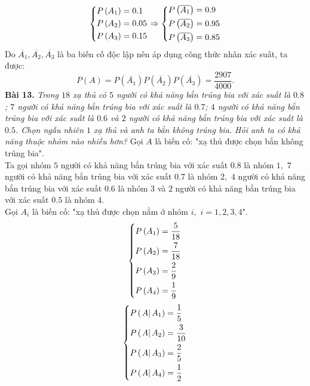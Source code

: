 \documentclass[12pt,a4paper]{article}
\begin{document}
$$\left\{ \begin{gathered}
  P\left( {{A_1}} \right) = 0.1 \hfill \\
  P\left( {{A_2}} \right) = 0.05 \hfill \\
  P\left( {{A_3}} \right) = 0.15 \hfill \\ 
\end{gathered}  \right. \Rightarrow \left\{ \begin{gathered}
  P\left( {\overline {{A_1}} } \right) = 0.9 \hfill \\
  P\left( {\overline {{A_2}} } \right) = 0.95 \hfill \\
  P\left( {\overline {{A_3}} } \right) = 0.85 \hfill \\ 
\end{gathered}  \right.$$
Do $\overline{A_1}, \overline{A_2},\overline{A_3}$ là ba biến cố độc lập nên áp dụng công thức nhân xác suất, ta được:
$$P\left( A \right) = P\left( {\overline {{A_1}} } \right)P\left( {\overline {{A_2}} } \right)P\left( {\overline {{A_3}} } \right) = \frac{{2907}}{{4000}}.$$
\textbf{Bài 13.} \textit{Trong $18$ xạ thủ có $5$ người có khả năng bắn trúng bia với xác suất là $0.8$; $7$ người có khả năng bắn trúng bia với xác suất là $0.7$; $4$ người có khả năng bắn trúng bia với xác suất là $0.6$ và $2$ người có khả năng bắn trúng bia với xác suất là $0.5$. Chọn  ngẫu  nhiên  $1$  xạ  thủ  và  anh  ta  bắn  không  trúng  bia.  Hỏi  anh  ta  có  khả  năng thuộc nhóm nào nhiều hơn?}
Gọi $A$ là biến cố: "xạ thủ được chọn bắn không trúng bia".\\
Ta gọi nhóm $5$ người có khả năng bắn trúng bia với xác suất $0.8$ là nhóm $1,$ $7$ người có khả năng bắn trúng bia với xác suất $0.7$ là nhóm $2,$ $4$ người có khả năng bắn trúng bia với xác suất $0.6$ là nhóm $3$ và $2$ người có khả năng bắn trúng bia với xác suất $0.5$ là nhóm $4.$\\
Gọi $A_i$ là biến cố: "xạ thủ được chọn nằm ở nhóm $i,$ $i = 1, 2, 3, 4$".\\
$$\left\{ \begin{gathered}
  P\left( {{A_1}} \right) = \frac{5}{{18}} \hfill \\
  P\left( {{A_2}} \right) = \frac{7}{{18}} \hfill \\
  P\left( {{A_3}} \right) = \frac{2}{9} \hfill \\
  P\left( {{A_4}} \right) = \frac{1}{9} \hfill \\ 
\end{gathered}  \right.$$
$$\left\{ \begin{gathered}
  P\left( {\left. A \right|{A_1}} \right) = \frac{1}{5} \hfill \\
  P\left( {\left. A \right|{A_2}} \right) = \frac{3}{{10}} \hfill \\
  P\left( {\left. A \right|{A_3}} \right) = \frac{2}{5} \hfill \\
  P\left( {\left. A \right|{A_4}} \right) = \frac{1}{2} \hfill \\ 
\end{gathered}  \right.$$
\end{document}
